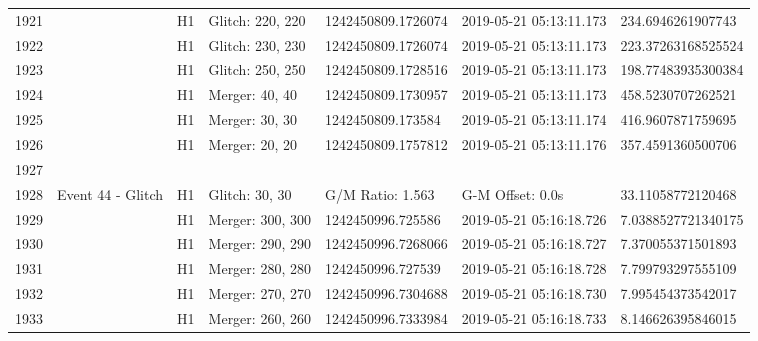 \begin{longtable}{lllllll}
1921 &                                                    &       H1 &  Glitch: 220, 220 &  1242450809.1726074 &  2019-05-21 05:13:11.173 &   234.6946261907743 \\
1922 &                                                    &       H1 &  Glitch: 230, 230 &  1242450809.1726074 &  2019-05-21 05:13:11.173 &  223.37263168525524 \\
1923 &                                                    &       H1 &  Glitch: 250, 250 &  1242450809.1728516 &  2019-05-21 05:13:11.173 &  198.77483935300384 \\
1924 &                                                    &       H1 &    Merger: 40, 40 &  1242450809.1730957 &  2019-05-21 05:13:11.173 &   458.5230707262521 \\
1925 &                                                    &       H1 &    Merger: 30, 30 &   1242450809.173584 &  2019-05-21 05:13:11.174 &   416.9607871759695 \\
1926 &                                                    &       H1 &    Merger: 20, 20 &  1242450809.1757812 &  2019-05-21 05:13:11.176 &   357.4591360500706 \\
1927 &                                                    &          &                   &                     &                          &                     \\
1928 &                                  Event 44 - Glitch &       H1 &    Glitch: 30, 30 &    G/M Ratio: 1.563 &         G-M Offset: 0.0s &   33.11058772120468 \\
1929 &                                                    &       H1 &  Merger: 300, 300 &   1242450996.725586 &  2019-05-21 05:16:18.726 &  7.0388527721340175 \\
1930 &                                                    &       H1 &  Merger: 290, 290 &  1242450996.7268066 &  2019-05-21 05:16:18.727 &   7.370055371501893 \\
1931 &                                                    &       H1 &  Merger: 280, 280 &   1242450996.727539 &  2019-05-21 05:16:18.728 &   7.799793297555109 \\
1932 &                                                    &       H1 &  Merger: 270, 270 &  1242450996.7304688 &  2019-05-21 05:16:18.730 &   7.995454373542017 \\
1933 &                                                    &       H1 &  Merger: 260, 260 &  1242450996.7333984 &  2019-05-21 05:16:18.733 &   8.146626395846015 \\

\end{longtable}

